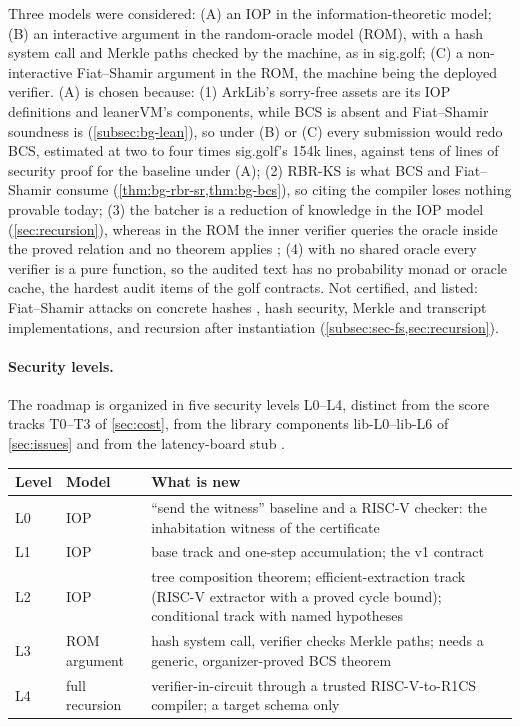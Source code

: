 \noindent Three models were considered: (A) an IOP in the information-theoretic model; (B) an
interactive argument in the random-oracle model (ROM), with a hash system call and Merkle paths
checked by the machine, as in sig.golf; (C) a non-interactive Fiat--Shamir argument in the ROM, the
machine being the deployed verifier. (A) is chosen because: (1) ArkLib's sorry-free assets are its
IOP definitions and leanerVM's components, while BCS is absent and Fiat--Shamir soundness is
 (\cref{subsec:bg-lean}), so under (B) or (C) every submission would redo BCS, estimated
at two to four times sig.golf's 154k lines, against tens of lines of security proof for the
baseline under (A); (2) RBR-KS is what BCS and Fiat--Shamir consume (\cref{thm:bg-rbr-sr,thm:bg-bcs}),
so citing the compiler loses nothing provable today; (3) the batcher is a reduction of knowledge in
the IOP model (\cref{sec:recursion}), whereas in the ROM the inner verifier queries the oracle inside
the proved relation and no theorem applies \cite{BCG24-RelROM}; (4) with no shared oracle every
verifier is a pure function, so the audited text has no probability monad or oracle cache, the
hardest audit items of the golf contracts. Not certified, and listed: Fiat--Shamir attacks on
concrete hashes \cite{KRS25,Fen26-GenR1CS}, hash security, Merkle and transcript implementations,
and recursion after instantiation (\cref{subsec:sec-fs,sec:recursion}).

\paragraph{Security levels.} The roadmap is organized in five security levels L0--L4, distinct from
the score tracks T0--T3 of \cref{sec:cost}, from the library components lib-L0--lib-L6 of
\cref{sec:issues} and from the latency-board stub .
\begin{center}\small
\begin{tabularx}{\linewidth}{@{}l>{\raggedright\arraybackslash}p{2.2cm}X@{}}
\toprule
Level & Model & What is new \\
\midrule
L0 & IOP & ``send the witness'' baseline and a RISC-V checker: the inhabitation witness of the certificate \\
L1 & IOP & base track and one-step accumulation; the v1 contract \\
L2 & IOP & tree composition theorem; efficient-extraction track (RISC-V extractor with a proved cycle bound); conditional track with named hypotheses \\
L3 & ROM argument & hash system call, verifier checks Merkle paths; needs a generic, organizer-proved BCS theorem \\
L4 & full recursion & verifier-in-circuit through a trusted RISC-V-to-R1CS compiler; a target schema only \\
\bottomrule
\end{tabularx}
\end{center}

